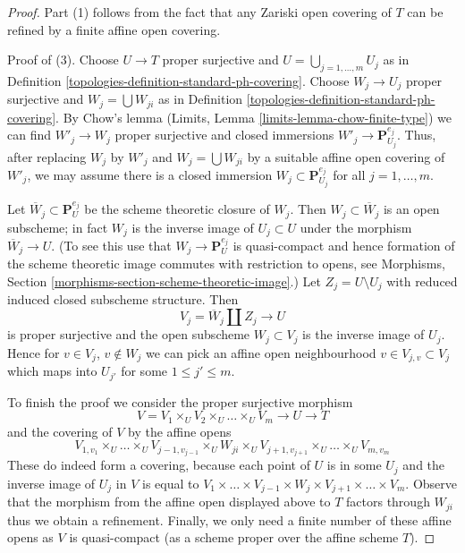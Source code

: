 \begin{proof}

Part (1) follows from the fact that any Zariski open covering of $T$
can be refined by a finite affine open covering.

\medskip\noindent
Proof of (3). Choose $U \to T$ proper surjective and
$U = \bigcup_{j = 1, \ldots, m} U_j$ as in
Definition \ref{topologies-definition-standard-ph-covering}.
Choose $W_j \to U_j$ proper surjective and $W_j = \bigcup W_{ji}$
as in Definition \ref{topologies-definition-standard-ph-covering}.
By Chow's lemma (Limits, Lemma \ref{limits-lemma-chow-finite-type})
we can find $W'_j \to W_j$ proper surjective
and closed immersions $W'_j \to \mathbf{P}^{e_j}_{U_j}$.
Thus, after replacing $W_j$ by $W'_j$ and $W_j = \bigcup W_{ji}$
by a suitable affine open covering of $W'_j$, we may assume
there is a closed immersion $W_j \subset \mathbf{P}^{e_j}_{U_j}$
for all $j = 1, \ldots, m$.

\medskip\noindent
Let $\overline{W}_j \subset \mathbf{P}^{e_j}_U$ be the
scheme theoretic closure of $W_j$. Then $W_j \subset \overline{W}_j$
is an open subscheme; in fact $W_j$ is the inverse image of
$U_j \subset U$ under the morphism $\overline{W}_j \to U$.
(To see this use that $W_j \to \mathbf{P}^{e_j}_U$ is quasi-compact
and hence formation of the scheme theoretic image commutes
with restriction to opens, see
Morphisms, Section \ref{morphisms-section-scheme-theoretic-image}.)
Let $Z_j = U \setminus U_j$
with reduced induced closed subscheme structure.
Then
$$
V_j = \overline{W}_j \amalg Z_j \to U
$$
is proper surjective and the open subscheme $W_j \subset V_j$
is the inverse image of $U_j$. Hence for $v \in V_j$, $v \not \in W_j$
we can pick an affine open neighbourhood $v \in V_{j, v} \subset V_j$
which maps into $U_{j'}$ for some $1 \leq j' \leq m$.

\medskip\noindent
To finish the proof we consider the proper surjective morphism
$$
V = V_1 \times_U V_2 \times_U \ldots \times_U V_m
\longrightarrow U \longrightarrow T
$$
and the covering of $V$ by the affine opens
$$
V_{1, v_1} \times_U \ldots \times_U V_{j - 1, v_{j - 1}}
\times_U W_{j i} \times_U
V_{j + 1, v_{j + 1}} \times_U \ldots \times_U V_{m, v_m}
$$
These do indeed form a covering, because each point of $U$ is
in some $U_j$ and the inverse image of $U_j$ in $V$ is equal to
$V_1 \times \ldots \times V_{j - 1} \times W_j \times V_{j + 1} \times
\ldots \times V_m$. Observe that the morphism from
the affine open displayed above to $T$ factors through $W_{ji}$
thus we obtain a refinement. Finally, we only need a finite number
of these affine opens as $V$ is quasi-compact (as a scheme proper
over the affine scheme $T$).
\end{proof}

